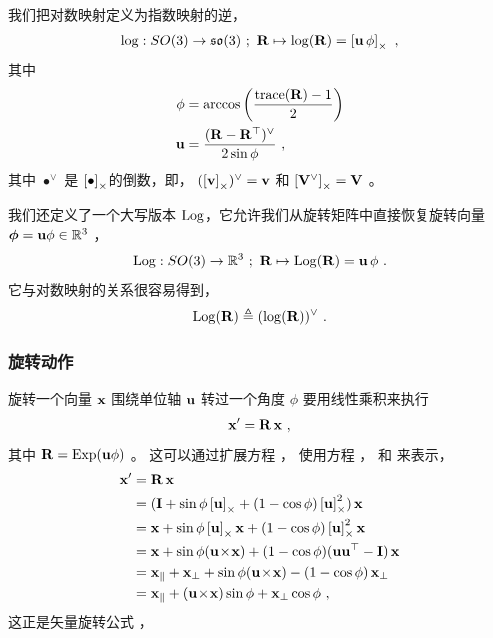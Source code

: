 我们把对数映射定义为指数映射的逆，
%
\begin{align}
\log : SO(3)\to{\mathfrak {so}}(3)~;~ {\bf R} \mapsto \log({\bf R})=\left[{\bf u}\,\phi\right]_\times
~,
\end{align}
%
其中
%
\begin{align}
\phi &= \arccos\left(\frac{\operatorname*{trace}({\bf R})-1}{2}\right) 
\\
{\bf u} &= \frac{({\bf R}-{\bf R}^{\top})^\vee}{2\sin\phi} 
~,
\end{align}
%
其中 $\bullet^\vee$ 是 $\left[\bullet\right]_\times$的倒数，即， $(\left[{\bf v}\right]_\times)^\vee={\bf v}$ 和 $\left[{\bf V}^\vee\right]_\times={\bf V}$ 。

我们还定义了一个大写版本 $\operatorname*{Log}$，它允许我们从旋转矩阵中直接恢复旋转向量 ${\bm \phi}={\bf u}\phi\in{\mathbb R}^3$ ， 
%
\begin{subequations}
\begin{align}
\operatorname*{Log}: SO(3) \to {\mathbb R}^3 ~;~ {\bf R}\mapsto\operatorname*{Log}({\bf R}) = {\bf u}\,\phi 
~.
\end{align}
\end{subequations}
%
它与对数映射的关系很容易得到，
%
\begin{align}
\operatorname*{Log}({\bf R}) \triangleq (\log({\bf R}))^\vee
~.
\end{align}



\subsubsection{旋转动作}

旋转一个向量 ${\bf x}$ 围绕单位轴 ${\bf u}$ 转过一个角度 $\phi$ %
要用线性乘积来执行
%
\begin{align}
{\bf x}'={\bf R}\,{\bf x}
~, 
\label{equ:rotWithMat}
\end{align}
%
其中 ${\bf R}=\operatorname*{Exp}({\bf u}\phi)$ 。
这可以通过扩展方程  ，
使用方程  ，   和  来表示，
%
\begin{align}
\begin{split}
{\bf x}' &= {\bf R}\,{\bf x}  \\
&= ({\bf I} + \sin\phi\left[{\bf u}\right]_\times + (1-\cos\phi)\left[{\bf u}\right]_\times^2)\,{\bf x}  \\
&= {\bf x} + \sin\phi\left[{\bf u}\right]_\times{\bf x} + (1-\cos\phi)\left[{\bf u}\right]_\times^2{\bf x}  \\
&= {\bf x} + \sin\phi({\bf u}\!\times\!{\bf x}) + (1-\cos\phi)({\bf u}{\bf u}^{\top}-{\bf I})\,{\bf x}  \\
&= {\bf x}_\| + {\bf x}_\bot + \sin\phi({\bf u}\!\times\!{\bf x}) - (1-\cos\phi)\,{\bf x}_\bot  \\
&= {\bf x}_\| + ({\bf u}\!\times\!{\bf x})\sin\phi + {\bf x}_\bot\cos\phi
~,
\end{split}
\end{align}%
%
这正是矢量旋转公式  ，


